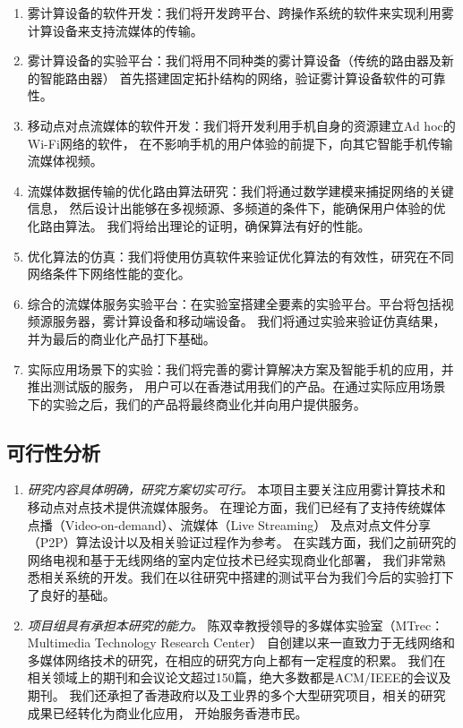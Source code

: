 \begin{enumerate}
\item 雾计算设备的软件开发：我们将开发跨平台、跨操作系统的软件来实现利用雾计算设备来支持流媒体的传输。
\item 雾计算设备的实验平台：我们将用不同种类的雾计算设备（传统的路由器及新的智能路由器）
首先搭建固定拓扑结构的网络，验证雾计算设备软件的可靠性。
\item 移动点对点流媒体的软件开发：我们将开发利用手机自身的资源建立Ad hoc的Wi-Fi网络的软件，
在不影响手机的用户体验的前提下，向其它智能手机传输流媒体视频。
\item 流媒体数据传输的优化路由算法研究：我们将通过数学建模来捕捉网络的关键信息，
然后设计出能够在多视频源、多频道的条件下，能确保用户体验的优化路由算法。
我们将给出理论的证明，确保算法有好的性能。
\item 优化算法的仿真：我们将使用仿真软件来验证优化算法的有效性，研究在不同网络条件下网络性能的变化。
\item 综合的流媒体服务实验平台：在实验室搭建全要素的实验平台。平台将包括视频源服务器，雾计算设备和移动端设备。
我们将通过实验来验证仿真结果，并为最后的商业化产品打下基础。
\item 实际应用场景下的实验：我们将完善的雾计算解决方案及智能手机的应用，并推出测试版的服务，
用户可以在香港试用我们的产品。在通过实际应用场景下的实验之后，我们的产品将最终商业化并向用户提供服务。
\end{enumerate}

\subsection{可行性分析}

\begin{enumerate}
\item \emph{研究内容具体明确，研究方案切实可行。}
本项目主要关注应用雾计算技术和移动点对点技术提供流媒体服务。
在理论方面，我们已经有了支持传统媒体点播（Video-on-demand）、流媒体（Live Streaming）
及点对点文件分享（P2P）算法设计以及相关验证过程作为参考。
在实践方面，我们之前研究的网络电视和基于无线网络的室内定位技术已经实现商业化部署，
我们非常熟悉相关系统的开发。我们在以往研究中搭建的测试平台为我们今后的实验打下了良好的基础。

\item \emph{项目组具有承担本研究的能力。}
陈双幸教授领导的多媒体实验室（MTrec：Multimedia Technology Research Center）
自创建以来一直致力于无线网络和多媒体网络技术的研究，在相应的研究方向上都有一定程度的积累。
我们在相关领域上的期刊和会议论文超过150篇，绝大多数都是ACM/IEEE的会议及期刊。
我们还承担了香港政府以及工业界的多个大型研究项目，相关的研究成果已经转化为商业化应用，
开始服务香港市民。
\end{enumerate}

